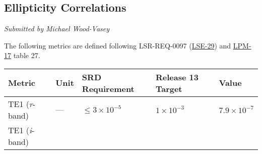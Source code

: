 \subsection{Ellipticity Correlations}\label{ellipticity-correlations}

\emph{Submitted by Michael Wood-Vasey}

The following metrics are defined following LSR-REQ-0097
(\href{http://ls.st/lse-29}{LSE-29}) and
\href{http://ls.st/lpm-17}{LPM-17} table 27.

\begin{longtable}[]{@{}lllll@{}}
\toprule
\begin{minipage}[b]{0.13\columnwidth}\raggedright\strut
Metric\strut
\end{minipage} & \begin{minipage}[b]{0.05\columnwidth}\raggedright\strut
Unit\strut
\end{minipage} & \begin{minipage}[b]{0.24\columnwidth}\raggedright\strut
SRD Requirement\strut
\end{minipage} & \begin{minipage}[b]{0.21\columnwidth}\raggedright\strut
Release 13 Target\strut
\end{minipage} & \begin{minipage}[b]{0.22\columnwidth}\raggedright\strut
Value\strut
\end{minipage}\tabularnewline
\midrule
\endhead
\begin{minipage}[t]{0.13\columnwidth}\raggedright\strut
TE1 (\emph{r}-band)\strut
\end{minipage} & \begin{minipage}[t]{0.05\columnwidth}\raggedright\strut
---\strut
\end{minipage} & \begin{minipage}[t]{0.24\columnwidth}\raggedright\strut
\(\leq 3\times 10^{-5}\)\strut
\end{minipage} & \begin{minipage}[t]{0.21\columnwidth}\raggedright\strut
\(1 \times 10^{-3}\)\strut
\end{minipage} & \begin{minipage}[t]{0.22\columnwidth}\raggedright\strut
\(7.9 \times 10^{-7}\)\strut
\end{minipage}\tabularnewline
\begin{minipage}[t]{0.13\columnwidth}\raggedright\strut
TE1 (\emph{i}-band)\strut
\end{minipage} & \begin{minipage}[t]{0.05\columnwidth}\raggedright\strut

\end{minipage}
\end{longtable}
